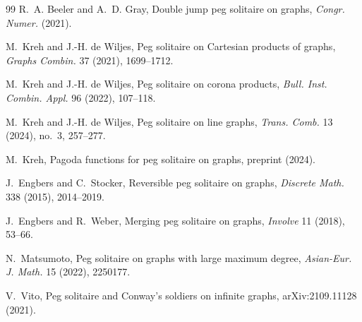 \documentclass[11pt]{article}
\theoremstyle{definition}
\begin{document}
\begin{thebibliography}{99}
 R.~A. Beeler and A.~D. Gray, Double jump peg solitaire
on graphs, \emph{Congr. Numer.} (2021).

 M.~Kreh and J.-H. de Wiljes, Peg solitaire on
Cartesian products of graphs, \emph{Graphs Combin.} 37 (2021),
1699--1712.

 M.~Kreh and J.-H. de Wiljes, Peg solitaire on
corona products, \emph{Bull. Inst. Combin. Appl.} 96 (2022),
107--118.

 M.~Kreh and J.-H. de Wiljes, Peg solitaire on line
graphs, \emph{Trans. Comb.} 13 (2024), no.~3, 257--277.

 M.~Kreh, Pagoda functions for peg solitaire on
graphs, preprint (2024).

 J.~Engbers and C.~Stocker, Reversible peg solitaire on
graphs, \emph{Discrete Math.} 338 (2015), 2014--2019.

 J.~Engbers and R.~Weber, Merging peg solitaire on graphs,
\emph{Involve} 11 (2018), 53--66.

 N.~Matsumoto, Peg solitaire on graphs with large maximum
degree, \emph{Asian-Eur. J. Math.} 15 (2022), 2250177.

 V.~Vito, Peg solitaire and Conway's soldiers on
infinite graphs, arXiv:2109.11128 (2021).

\end{thebibliography}
\end{document}

